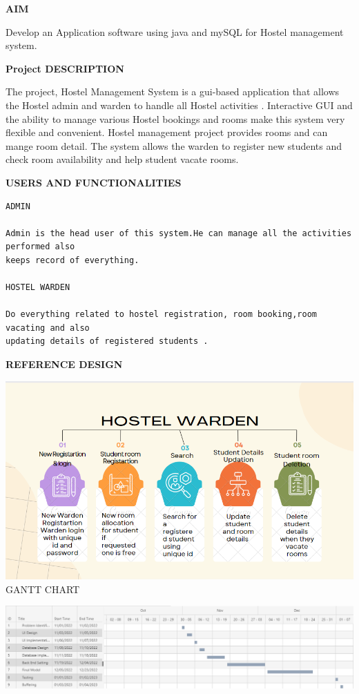 \documentclass[a4paper,12pt]{report}
\begin{document}
	\begin{flushleft}
		\textbf{AIM }
	\end{flushleft} 
	 Develop an Application software using java and mySQL for Hostel management system.

\begin{flushleft}
    \textbf{Project DESCRIPTION}
\end{flushleft}
The project, Hostel Management System is a gui-based application that allows the Hostel admin and warden to handle all Hostel activities . Interactive GUI and the ability to manage various Hostel bookings and rooms make this system very flexible and convenient. Hostel management project provides rooms and can mange room detail. The system allows the warden to register new students and check room availability and help student vacate rooms.
	\begin{flushleft}
		\textbf{USERS AND FUNCTIONALITIES }
	\end{flushleft}
 \begin{verbatim} 
ADMIN 

Admin is the head user of this system.He can manage all the activities performed also 
keeps record of everything.

HOSTEL WARDEN 

Do everything related to hostel registration, room booking,room vacating and also
updating details of registered students .
\end{verbatim}
\begin{flushleft}
		\textbf{REFERENCE DESIGN} 
\end{flushleft} 
\includegraphics[scale=0.6]{wardenusecase.png}
\newpage
GANTT CHART

\includegraphics[scale=0.35]{Picture1.png}
\end{document}
